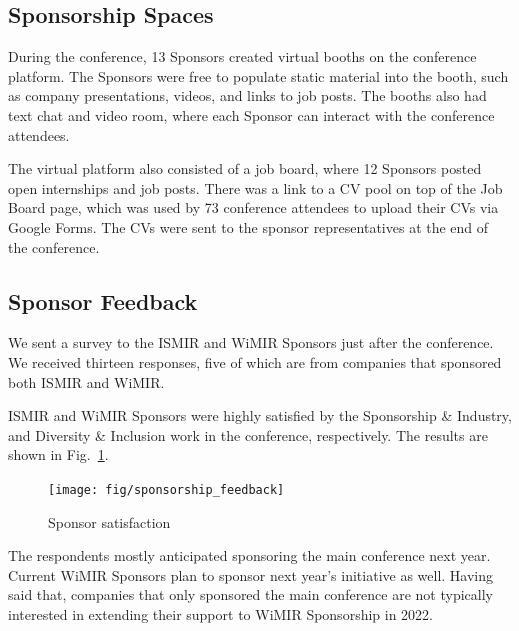 \documentclass[%
10pt,								%
titlepage,						%
]
{scrartcl}
\begin{document}
    \subsection{Sponsorship Spaces}
        During the conference, 13 Sponsors created virtual booths on the conference platform. The Sponsors were free to populate static material into the booth, such as company presentations, videos, and links to job posts. The booths also had text chat and video room, where each Sponsor can interact with the conference attendees.

        The virtual platform also consisted of a job board, where 12 Sponsors posted open internships and job posts. There was a link to a CV pool on top of the Job Board page, which was used by 73 conference attendees to upload their CVs via Google Forms. The CVs were sent to the sponsor representatives at the end of the conference. 
        
    \subsection{Sponsor Feedback}   
        We sent a survey to the ISMIR and WiMIR Sponsors just after the conference. We received thirteen responses, five of which are from companies that sponsored both ISMIR and WiMIR. 

        ISMIR and WiMIR Sponsors were highly satisfied by the Sponsorship \& Industry, and Diversity \& Inclusion work in the conference, respectively. The results are shown in Fig.~\ref{fig:sponsorship_feedback}.
        \begin{figure}%
        \centering
            \texttt{[image: fig/sponsorship\_feedback]}%
            \caption{Sponsor satisfaction}%
            \label{fig:sponsorship_feedback}%
        \end{figure}
        
        The respondents mostly anticipated sponsoring the main conference next year. Current WiMIR Sponsors plan to sponsor next year's initiative as well. Having said that, companies that only sponsored the main conference are not typically interested in extending their support to WiMIR Sponsorship in 2022.
        
\end{document}
